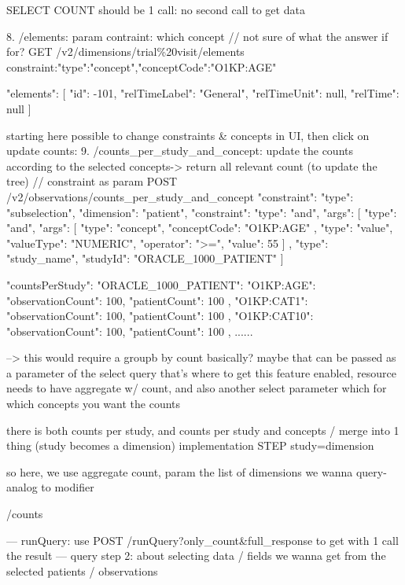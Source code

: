SELECT COUNT should be 1 call: no second call to get data


8. /elements: param contraint: which concept // not sure of what the answer if for?
GET /v2/dimensions/trial\%20visit/elements
constraint:{"type":"concept","conceptCode":"O1KP:AGE"}

{
  "elements": 
  [
    {
      "id": -101,
      "relTimeLabel": "General",
      "relTimeUnit": null,
      "relTime": null
    }
  ]
}


starting here possible to change constraints & concepts in UI, then click on update counts:
9. /counts\_per\_study\_and\_concept: update the counts according to the selected concepts-> return all relevant count (to update the tree) // constraint as param
POST /v2/observations/counts\_per\_study\_and\_concept
{
  "constraint": {
    "type": "subselection",
    "dimension": "patient",
    "constraint": {
      "type": "and",
      "args": [
        {
          "type": "and",
          "args": [
            {
              "type": "concept",
              "conceptCode": "O1KP:AGE"
            },
            {
              "type": "value",
              "valueType": "NUMERIC",
              "operator": ">=",
              "value": 55
            }
          ]
        },
        {
          "type": "study_name",
          "studyId": "ORACLE_1000_PATIENT"
        }
      ]
    }
  }
}

{
  "countsPerStudy": {
    "ORACLE_1000_PATIENT": {
      "O1KP:AGE": {
        "observationCount": 100,
        "patientCount": 100
      },
      "O1KP:CAT1": {
        "observationCount": 100,
        "patientCount": 100
      },
      "O1KP:CAT10": {
        "observationCount": 100,
        "patientCount": 100
      },
      ......
    }
  }
}

--> this would require a groupb by count basically? maybe that can be passed as a parameter of the select query
that's where to get this feature enabled, resource needs to have aggregate w/ count, and also another select parameter which for which concepts you want the counts

there is both counts per study, and counts per study and concepts / merge into 1 thing (study becomes a dimension)
implementation STEP study=dimension

so here, we use aggregate count, param the list of dimensions we wanna query-analog to modifier

/counts



---
runQuery: use POST /runQuery?only\_count&full\_response to get with 1 call the result
--- query step 2: about selecting data  / fields we wanna get from the selected patients / observations 

